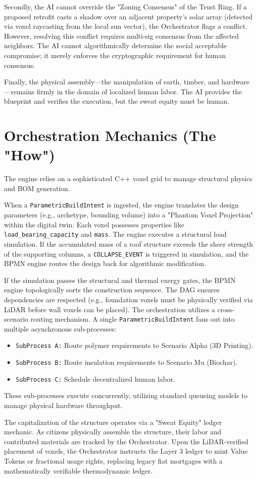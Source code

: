 Secondly, the AI cannot override the "Zoning Consensus" of the Trust Ring. If a proposed retrofit casts a shadow over an adjacent property's solar array (detected via voxel raycasting from the local sun vector), the Orchestrator flags a conflict. However, resolving this conflict requires multi-sig consensus from the affected neighbors. The AI cannot algorithmically determine the social acceptable compromise; it merely enforces the cryptographic requirement for human consensus.

Finally, the physical assembly---the manipulation of earth, timber, and hardware---remains firmly in the domain of localized human labor. The AI provides the blueprint and verifies the execution, but the sweat equity must be human.

\section{Orchestration Mechanics (The "How")}
The engine relies on a sophisticated C++ voxel grid to manage structural physics and BOM generation. 

When a \texttt{ParametricBuildIntent} is ingested, the engine translates the design parameters (e.g., archetype, bounding volume) into a "Phantom Voxel Projection" within the digital twin. Each voxel possesses properties like \texttt{load\_bearing\_capacity} and \texttt{mass}. The engine executes a structural load simulation. If the accumulated mass of a roof structure exceeds the sheer strength of the supporting columns, a \texttt{COLLAPSE\_EVENT} is triggered in simulation, and the BPMN engine routes the design back for algorithmic modification.

If the simulation passes the structural and thermal exergy gates, the BPMN engine topologically sorts the construction sequence. The DAG ensures dependencies are respected (e.g., foundation voxels must be physically verified via LiDAR before wall voxels can be placed). 
The orchestration utilizes a cross-scenario routing mechanism. A single \texttt{ParametricBuildIntent} fans out into multiple asynchronous sub-processes:
\begin{itemize}
    \item \texttt{SubProcess A:} Route polymer requirements to Scenario Alpha (3D Printing).
    \item \texttt{SubProcess B:} Route insulation requirements to Scenario Mu (Biochar).
    \item \texttt{SubProcess C:} Schedule decentralized human labor.
\end{itemize}
These sub-processes execute concurrently, utilizing standard queueing models to manage physical hardware throughput. 

The capitalization of the structure operates via a "Sweat Equity" ledger mechanic. As citizens physically assemble the structure, their labor and contributed materials are tracked by the Orchestrator. Upon the LiDAR-verified placement of voxels, the Orchestrator instructs the Layer 3 ledger to mint Value Tokens or fractional usage rights, replacing legacy fiat mortgages with a mathematically verifiable thermodynamic ledger.
